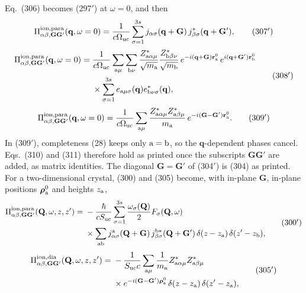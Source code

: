 \documentclass[11pt]{article}
\begin{document}
Eq.~(306) becomes (297$'$) at $\omega=0$, and then
\begin{equation*}
\Pi^{\rm ion,para}_{\alpha\beta,\mathbf G\mathbf G'}(\mathbf q,\omega=0)=\frac{1}{c\Omega_{\rm uc}}
\sum_{\sigma=1}^{3s}j_{\alpha\sigma}(\mathbf q+\mathbf G)\,j^*_{\beta\sigma}(\mathbf q+\mathbf G'),\tag{307$'$}
\end{equation*}
\begin{equation*}
\begin{split}
\Pi^{\rm ion,para}_{\alpha\beta,\mathbf G\mathbf G'}(\mathbf q,\omega=0)={}&\frac{1}{c\Omega_{\rm uc}}
\sum_{{\rm a}\mu}\sum_{{\rm b}\nu}\frac{Z^*_{{\rm a}\alpha\mu}}{\sqrt{m_{\rm a}}}
\frac{Z^*_{{\rm b}\beta\nu}}{\sqrt{m_{\rm b}}}\,e^{-i(\mathbf q+\mathbf G)\mathbf r^0_{\rm a}}\,
e^{i(\mathbf q+\mathbf G')\mathbf r^0_{\rm b}}\\
&\times\sum_{\sigma=1}^{3s}e_{{\rm a}\mu\sigma}(\mathbf q)
e^*_{{\rm b}\nu\sigma}(\mathbf q),
\end{split}
\tag{308$'$}
\end{equation*}
\begin{equation*}
\Pi^{\rm ion,para}_{\alpha\beta,\mathbf G\mathbf G'}(\mathbf q,\omega=0)=\frac{1}{c\Omega_{\rm uc}}
\sum_{{\rm a}\mu}\frac{Z^*_{{\rm a}\alpha\mu}Z^*_{{\rm a}\beta\mu}}{m_{\rm a}}\,
e^{-i(\mathbf G-\mathbf G')\mathbf r^0_{\rm a}}.\tag{309$'$}
\end{equation*}
In (309$'$), completeness (28) keeps only ${\rm a}={\rm b}$, so the $\mathbf q$-dependent phases cancel.
Eqs.~(310) and (311) therefore hold as printed once the subscripts $\mathbf G\mathbf G'$ are added, as
matrix identities. The diagonal $\mathbf G=\mathbf G'$ of (304$'$) is (304) as printed. For a
two-dimensional crystal, (300) and (305) become, with in-plane $\mathbf G$, in-plane positions
$\bm{\rho}^0_{\rm a}$ and heights $z_{\rm a}$,
\begin{equation*}
\begin{split}
\Pi^{\rm ion,para}_{\alpha\beta,\mathbf G\mathbf G'}(\mathbf Q,\omega,z,z')={}&-\frac{\hbar}{cS_{\rm uc}}
\sum_{\sigma=1}^{3s}\frac{\omega_\sigma(\mathbf Q)}{2}F_\sigma(\mathbf Q,\omega)\\
&\times\sum_{\rm ab}j^{\rm a}_{\alpha\sigma}(\mathbf Q+\mathbf G)\,j^{{\rm b}*}_{\beta\sigma}(\mathbf Q+\mathbf G')\,
\delta(z-z_{\rm a})\,\delta(z'-z_{\rm b}),
\end{split}
\tag{300$'$}
\end{equation*}
\begin{equation*}
\begin{split}
\Pi^{\rm ion,dia}_{\alpha\beta,\mathbf G\mathbf G'}(\mathbf Q,\omega,z,z')={}&-\frac{1}{S_{\rm uc}c}
\sum_{{\rm a}\mu}\frac{1}{m_{\rm a}}Z^*_{{\rm a}\alpha\mu}Z^*_{{\rm a}\beta\mu}\\
&\times e^{-i(\mathbf G-\mathbf G')\bm{\rho}^0_{\rm a}}\,\delta(z-z_{\rm a})\,\delta(z'-z_{\rm a}),
\end{split}
\tag{305$'$}
\end{equation*}
\end{document}

